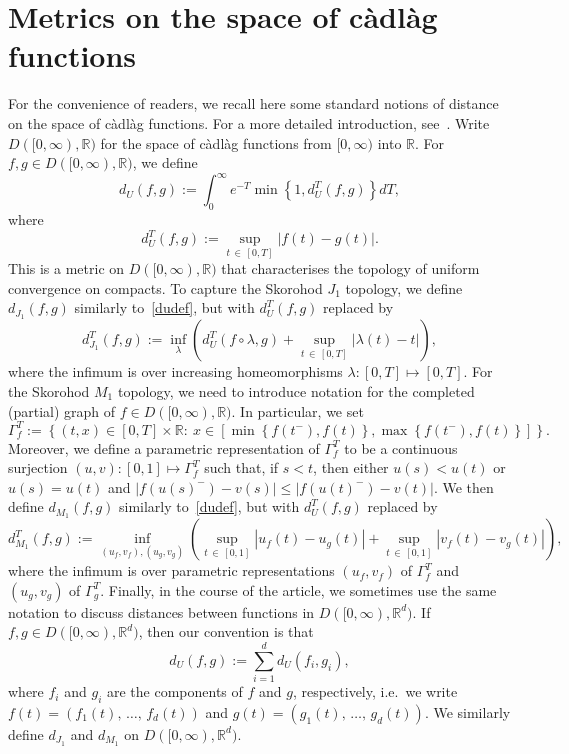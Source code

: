\documentclass[10pt]{amsart}
\theoremstyle{definition}\newtheorem{defi}[theo]{Definition}\newtheorem{rema}[theo]{Remark}\newtheorem{exam}[theo]{Example}\newtheorem{exem}[theo]{Example}\newtheorem{nota}[theo]{Notation}
\newcommand{\R}{\mathbb R}
\newcommand{\cadlag}{càdlàg }
\begin{document}
\appendix

\section{Metrics on the space of \cadlag functions}\label{metricapp}

For the convenience of readers, we recall here some standard notions of distance on the space of \cadlag functions. For a more detailed introduction, see~\cite[Chapters~3 and 12]{Whitt}. Write $D([0,\infty),\R)$ for the space of \cadlag functions from $[0,\infty)$ into $\R$. For $f,g\in D([0,\infty),\R)$, we define
\begin{equation}\label{dudef}
d_U(f,g):=\int_{0}^\infty e^{-T} \min\left\{1, d^T_U(f,g)\right\}dT,
\end{equation}
where
\[
d^T_U(f,g):=\sup_{t\,\in\,[0,T]}\left|f(t)-g(t)\right|.
\]
This is a metric on $D([0,\infty),\R)$ that characterises the topology of uniform convergence on compacts. To capture the Skorohod $J_1$ topology, we define $d_{J_1}(f,g)$ similarly to~\eqref{dudef}, but with $d^T_U(f,g)$ replaced by
\[
d^T_{J_1}(f,g):=\inf_{\lambda}\left(d^T_U(f\circ\lambda,g)+\sup_{t\,\in\,[0,T]}\left|\lambda(t)-t\right|\right),
\]
where the infimum is over increasing homeomorphisms $\lambda:[0,T]\mapsto[0,T]$. For the Skorohod $M_1$ topology, we need to introduce notation for the completed (partial) graph of $f\in D([0,\infty),\R)$. In particular, we set
\[
\Gamma^T_f:=\left\{(t,x)\in[0,T]\times \R:\:x\in\left[\min\left\{f(t^-),f(t)\right\},\max\left\{f(t^-),f(t)\right\}\right]\right\}.
\]
Moreover, we define a parametric representation of $\Gamma^T_f$ to be a continuous surjection $(u,v):[0,1]\mapsto \Gamma^T_f$ such that, if $s<t$, then either $u(s)<u(t)$ or $u(s)=u(t)$ and $|f(u(s)^-)-v(s)|\leq |f(u(t)^-)-v(t)|$. We then define $d_{M_1}(f,g)$ similarly to~\eqref{dudef}, but with $d^T_U(f,g)$ replaced by
\[
d^T_{M_1}(f,g):=\inf_{(u_f,v_f),(u_g,v_g)}\left(\sup_{t\,\in\,[0,1]}\left|u_f(t)-u_g(t)\right|+\sup_{t\,\in\,[0,1]}\left|v_f(t)-v_g(t)\right|\right),
\]
where the infimum is over parametric representations $(u_f,v_f)$ of $\Gamma^T_f$ and $(u_g,v_g)$ of $\Gamma^T_g$. Finally, in the course of the article, we sometimes use the same notation to discuss distances between functions in $D([0,\infty),\R^d)$. If $f,g\in D([0,\infty),\R^d)$, then our convention is that
\[
d_{U}(f,g):=\sum_{i=1}^dd_{U}(f_i,g_i),
\]
where $f_i$ and $g_i$ are the components of $f$ and $g$, respectively, i.e.\ we write $f(t)=(f_1(t),\,\dots,\,f_d(t))$ and $g(t)=(g_1(t),\,\dots,\,g_d(t))$. We similarly define $d_{J_1}$ and $d_{M_1}$ on $D([0,\infty),\R^d)$.
\end{document}
